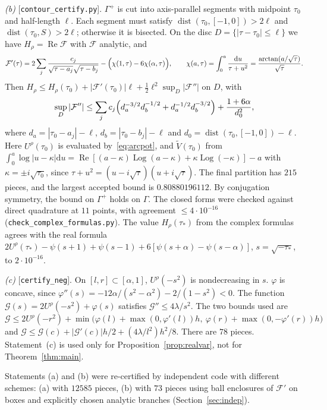 \documentclass[11pt]{article}
\theoremstyle{remark}
\newcommand{\Vt}{\widetilde{V}}
\newcommand{\dd}{\mathrm{d}}
\newcommand{\file}[1]{\texttt{#1}}
\DeclareMathOperator{\dist}{dist}
\DeclareMathOperator{\Log}{Log}
\begin{document}
\emph{(b)} [\file{contour\_certify.py}]. $\Gamma^+$ is cut into axis-parallel segments with midpoint $\tau_0$ and half-length $\ell$. Each segment must satisfy $\dist(\tau_0,[-1,0])>2\ell$ and $\dist(\tau_0,S)>2\ell$; otherwise it is bisected. On the disc $D=\{|\tau-\tau_0|\le\ell\}$ we have $H_\rho=\operatorname{Re}\mathcal F$ with $\mathcal F$ analytic, and
\[
\mathcal F'(\tau)=2\sum_j\frac{c_j}{\sqrt{\tau-a_j}\sqrt{\tau-b_j}}-\Bigl(\chi(1,\tau)-6\chi(\alpha,\tau)\Bigr),\qquad \chi(a,\tau)=\int_0^a\frac{\dd u}{\tau+u^2}=\frac{\arctan(a/\sqrt\tau)}{\sqrt\tau}.
\]
Then $H_\rho\le H_\rho(\tau_0)+|\mathcal F'(\tau_0)|\ell+\frac12\ell^2\sup_D|\mathcal F''|$ on $D$, with
\[
\sup_D|\mathcal F''|\le\sum_jc_j\Bigl(d_a^{-3/2}d_b^{-1/2}+d_a^{-1/2}d_b^{-3/2}\Bigr)+\frac{1+6\alpha}{d_0^2},
\]
where $d_a=|\tau_0-a_j|-\ell$, $d_b=|\tau_0-b_j|-\ell$ and $d_0=\dist(\tau_0,[-1,0])-\ell$. Here $U^\rho(\tau_0)$ is evaluated by~\eqref{eq:arcpot}, and $\Vt(\tau_0)$ from $\int_0^a\log|u-\kappa|\dd u=\operatorname{Re}[(a-\kappa)\Log(a-\kappa)+\kappa\Log(-\kappa)]-a$ with $\kappa=\pm i\sqrt{\tau_0}$, since $\tau+u^2=(u-i\sqrt\tau)(u+i\sqrt\tau)$. The final partition has $215$ pieces, and the largest accepted bound is $0.80880196112$. By conjugation symmetry, the bound on $\Gamma^+$ holds on $\Gamma$. The closed forms were checked against direct quadrature at $11$ points, with agreement $\le4\cdot10^{-16}$ (\file{check\_complex\_formulas.py}). The value $H_\rho(\tau_*)$ from the complex formulas agrees with the real formula $2U^\rho(\tau_*)-\psi(s+1)+\psi(s-1)+6[\psi(s+\alpha)-\psi(s-\alpha)]$, $s=\sqrt{-\tau_*}$, to $2\cdot10^{-16}$.

\emph{(c)} [\file{certify\_neg}]. On $[l,r]\subset[\alpha,1]$, $U^\rho(-s^2)$ is nondecreasing in $s$. $\varphi$ is concave, since $\varphi''(s)=-12\alpha/(s^2-\alpha^2)-2/(1-s^2)<0$. The function $\mathcal G(s)=2U^\rho(-s^2)+\varphi(s)$ satisfies $\mathcal G''\le4\lambda/s^2$. The two bounds used are
\[
\mathcal G\le2U^\rho(-r^2)+\min\bigl(\varphi(l)+\max(0,\varphi'(l))h,\ \varphi(r)+\max(0,-\varphi'(r))h\bigr)
\]
and $\mathcal G\le\mathcal G(c)+|\mathcal G'(c)|h/2+(4\lambda/l^2)h^2/8$. There are $78$ pieces. Statement~(c) is used only for Proposition~\ref{prop:realvar}, not for Theorem~\ref{thm:main}.

Statements (a) and (b) were re-certified by independent code with different schemes: (a) with $12585$ pieces, (b) with $73$ pieces using ball enclosures of $\mathcal F'$ on boxes and explicitly chosen analytic branches (Section~\ref{sec:indep}).
\end{document}
